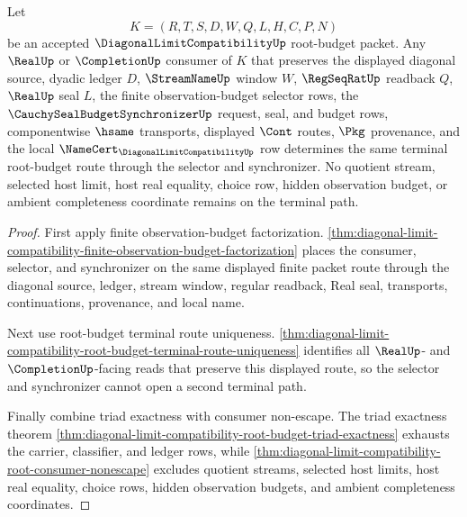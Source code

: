 \begin{theorem}
\label{thm:diagonal-limit-compatibility-root-budget-selector-synchronizer-exactness}
Let
$$
K=(R,T,S,D,W,Q,L,H,C,P,N)
$$
be an accepted $\DiagonalLimitCompatibilityUp$ root-budget packet. Any $\RealUp$ or $\CompletionUp$ consumer of $K$ that preserves the displayed diagonal source, dyadic ledger $D$, $\StreamNameUp$ window $W$, $\RegSeqRatUp$ readback $Q$, $\RealUp$ seal $L$, the finite observation-budget selector rows, the $\CauchySealBudgetSynchronizerUp$ request, seal, and budget rows, componentwise $\hsame$ transports, displayed $\Cont$ routes, $\Pkg$ provenance, and the local $\NameCert_{\DiagonalLimitCompatibilityUp}$ row determines the same terminal root-budget route through the selector and synchronizer. No quotient stream, selected host limit, host real equality, choice row, hidden observation budget, or ambient completeness coordinate remains on the terminal path.
\end{theorem}
\begin{proof}
First apply finite observation-budget factorization. \autoref{thm:diagonal-limit-compatibility-finite-observation-budget-factorization} places the consumer, selector, and synchronizer on the same displayed finite packet route through the diagonal source, ledger, stream window, regular readback, Real seal, transports, continuations, provenance, and local name.

Next use root-budget terminal route uniqueness. \autoref{thm:diagonal-limit-compatibility-root-budget-terminal-route-uniqueness} identifies all $\RealUp$- and $\CompletionUp$-facing reads that preserve this displayed route, so the selector and synchronizer cannot open a second terminal path.

Finally combine triad exactness with consumer non-escape. The triad exactness theorem \autoref{thm:diagonal-limit-compatibility-root-budget-triad-exactness} exhausts the carrier, classifier, and ledger rows, while \autoref{thm:diagonal-limit-compatibility-root-consumer-nonescape} excludes quotient streams, selected host limits, host real equality, choice rows, hidden observation budgets, and ambient completeness coordinates.
\end{proof}

